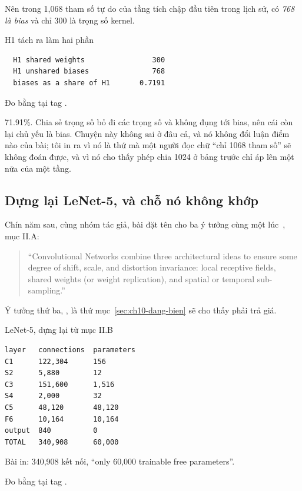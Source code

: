 Nên trong 1,068 tham số tự do của tầng tích chập đầu tiên trong lịch sử, có
\emph{768 là bias} và chỉ 300 là trọng số kernel.

\begin{measured}{H1 tách ra làm hai phần}
\begin{verbatim}
  H1 shared weights                300
  H1 unshared biases               768
  biases as a share of H1       0.7191
\end{verbatim}

Đo bằng  tại tag .
\end{measured}

71.91\%. Chia sẻ trọng số bỏ đi các trọng số và không đụng tới bias, nên cái
còn lại chủ yếu là bias. Chuyện này không sai ở đâu cả, và nó không đổi luận
điểm nào của bài; tôi in ra vì nó là thứ mà một người đọc chữ \enquote{chỉ 1068
tham số} sẽ không đoán được, và vì nó cho thấy phép chia 1024 ở bảng trước chỉ
áp lên một nửa của một tầng.

\subsection*{Dựng lại LeNet-5, và chỗ nó không khớp}

%
Chín năm sau, cùng nhóm tác giả, bài đặt tên cho ba ý tưởng cùng một
lúc~\autocite{lecun1998gradient}, mục II.A:

\begin{quote}
\enquote{Convolutional Networks combine three architectural ideas to ensure
some degree of shift, scale, and distortion invariance: local receptive fields,
shared weights (or weight replication), and spatial or temporal sub-sampling.}
\end{quote}

Ý tưởng thứ ba, , là thứ mục~\ref{sec:ch10-dang-bien}
sẽ cho thấy phải trả giá.

\begin{measured}{LeNet-5, dựng lại từ mục II.B}
\begin{verbatim}
layer   connections  parameters
C1      122,304      156
S2      5,880        12
C3      151,600      1,516
S4      2,000        32
C5      48,120       48,120
F6      10,164       10,164
output  840          0
TOTAL   340,908      60,000
\end{verbatim}

Bài in: 340,908 kết nối, \enquote{only 60,000 trainable free parameters}.

Đo bằng  tại tag .
\end{measured}

